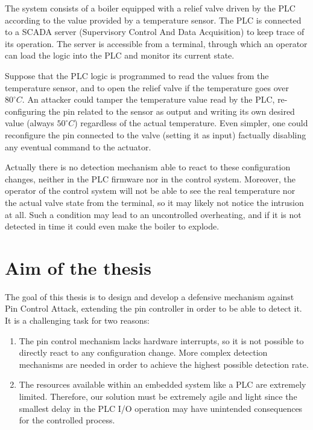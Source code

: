 The system consists of a boiler equipped with a relief valve driven by the PLC according to the value provided by a temperature sensor.
The PLC is connected to a SCADA server (Supervisory Control And Data Acquisition) to keep trace of its operation.
The server is accessible from a terminal, through which an operator can load the logic into the PLC and monitor its current state.

Suppose that the PLC logic is programmed to read the values from the temperature sensor, and to open the relief valve if the temperature goes over $80^\circ C$.
An attacker could tamper the temperature value read by the PLC, re-configuring the pin related to the sensor as output and writing its own desired value
(\eg always $50^\circ C$) regardless of the actual temperature.
Even simpler, one could reconfigure the pin connected to the valve (\eg setting it as input) factually disabling any eventual command to the actuator.

Actually there is no detection mechanism able to react to these configuration changes, neither in the PLC firmware nor in the control system.
Moreover, the operator of the control system will not be able to see the real temperature nor the actual valve state from the terminal,
so it may likely not notice the intrusion at all.
Such a condition may lead to an uncontrolled overheating, and if it is not detected in time it could even make the boiler to explode.


\section{Aim of the thesis}

The goal of this thesis is to design and develop a defensive mechanism against Pin Control Attack, extending the pin controller in order to be able to detect it.
It is a challenging task for two reasons:
\begin{enumerate}
	\item The pin control mechanism lacks hardware interrupts, so it is not possible to directly react to any configuration change. More complex detection mechanisms are needed
		in order to achieve the highest possible detection rate.
	\item The resources available within an embedded system like a PLC are extremely limited. Therefore, our solution must be extremely agile and light
		since the smallest delay in the PLC I/O operation may have unintended consequences for the controlled process.
\end{enumerate}

